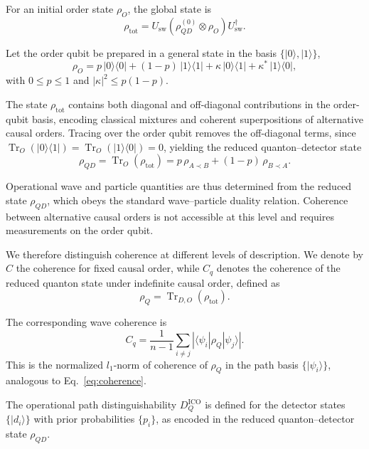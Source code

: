 \documentclass[aps,pra,reprint,superscriptaddress]{revtex4-2}
\begin{document}
For an initial order state $\rho_O$, the global state is
\begin{equation}
\rho_{\mathrm{tot}} =
U_{\mathrm{sw}}
\left(\rho^{(0)}_{QD} \otimes \rho_O\right)
U_{\mathrm{sw}}^\dagger .
\end{equation}

Let the order qubit be prepared in a general state in the basis
$\{|0\rangle,|1\rangle\}$,
\begin{equation}
\rho_O = p\,|0\rangle\langle0|
+ (1-p)\,|1\rangle\langle1|
+ \kappa\,|0\rangle\langle1|
+ \kappa^*\,|1\rangle\langle0|,
\end{equation}
with $0 \le p \le 1$ and $|\kappa|^2 \le p(1-p)$.

The state $\rho_{\mathrm{tot}}$ contains both diagonal and
off-diagonal contributions in the order-qubit basis, encoding
classical mixtures and coherent superpositions of alternative
causal orders. Tracing over the order qubit removes the
off-diagonal terms, since
$\operatorname{Tr}_O(|0\rangle\langle1|)=
\operatorname{Tr}_O(|1\rangle\langle0|)=0$,
yielding the reduced quanton--detector state
\begin{equation}
\rho_{QD} = \operatorname{Tr}_O(\rho_{\mathrm{tot}})
= p\,\rho_{A\prec B}
+ (1-p)\,\rho_{B\prec A}.
\label{eq:convexrho}
\end{equation}

Operational wave and particle quantities are thus determined from the reduced state $\rho_{QD}$, which obeys the standard wave--particle duality relation. Coherence between alternative causal orders is not accessible at this level and requires measurements on the order qubit.

We therefore distinguish coherence at different levels of description. We denote by $C$ the coherence for fixed causal order, while $C_q$ denotes the coherence of the reduced quanton state under indefinite causal order, defined as
\[
\rho_Q = \operatorname{Tr}_{D,O}(\rho_{\mathrm{tot}}).
\]

The corresponding wave coherence is
\begin{equation}
C_q =
\frac{1}{n-1} \sum_{i\neq j}
\left| \langle\psi_i|\rho_Q|\psi_j\rangle \right|.
\end{equation}
This is the normalized $l_1$-norm of coherence of $\rho_Q$ in the path basis $\{|\psi_i\rangle\}$, analogous to Eq.~\eqref{eq:coherence}.

The operational path distinguishability $D_Q^{\mathrm{ICO}}$ is defined for the detector states $\{|d_i\rangle\}$ with prior probabilities $\{p_i\}$, as encoded in the reduced quanton--detector state $\rho_{QD}$.
\end{document}
